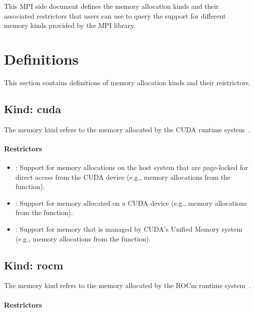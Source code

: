 This MPI side document defines the memory allocation kinds and their
associated restrictors that users can use to query the support for
different memory kinds provided by the MPI library.

\chapter{Definitions}

This section contains definitions of memory allocation kinds and
their reistrictors.

\section{Kind: cuda}

The  memory kind refers to the memory allocated by the
CUDA runtime system~\cite{cudaref}.

\subsubsection{Restrictors}

\begin{itemize}

\item {}: Support for memory allocations on the host system
    that are page-locked for direct access from the CUDA device (e.g.,
        memory allocations from the  function).

\item {}: Support for memory allocated on a CUDA device
    (e.g., memory allocations from the  function).

\item {}: Support for memory that is managed by CUDA’s
    Unified Memory system (e.g., memory allocations from the
         function).

\end{itemize}

\section{Kind: rocm}

The  memory kind refers to the memory allocated by the ROCm
runtime system~\cite{rocmref}.

\subsubsection{Restrictors}

